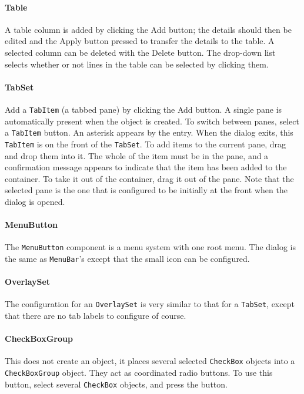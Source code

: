 \paragraph{Table}
A table column is added by clicking the Add button; the details should
then be edited and the Apply button pressed to transfer the details to
the table. A selected column can be deleted with the Delete button. The
drop-down list selects whether or not lines in the table can be
selected by clicking them.

\paragraph[TabSet]{TabSet}
Add a \texttt{TabItem} (a tabbed pane) by clicking the Add button.
A single pane is automatically present when the object is created.
To switch between panes, select a \texttt{TabItem} button. An asterisk
appears by the entry. When the dialog exits, this
\texttt{TabItem} is on the front of the \texttt{TabSet}. To add
items to the current pane, drag and drop them into it. The whole
of the item must be in the pane, and a confirmation message appears to
indicate that the item has been added to the container. To take it out
of the container, drag it out of the pane. Note that the selected
pane is the one that is configured to be initially at the front when
the dialog is opened.

\paragraph{MenuButton}
The \texttt{MenuButton} component is a menu system with one root
menu. The dialog is the same as \texttt{MenuBar}'s except that
the small icon can be configured.

\paragraph{OverlaySet}
The configuration for an \texttt{OverlaySet} is very similar to that for
a \texttt{TabSet}, except that there are no tab labels to configure of
course.

\paragraph{CheckBoxGroup}
This does not create an object, it
places several selected \texttt{CheckBox} objects into a
\texttt{CheckBoxGroup} object. They act as coordinated radio
buttons. To use this button, select several \texttt{CheckBox}
objects, and press the button.


